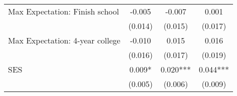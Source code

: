 {\begin{tabular}{lccc}
\hspace{3mm}Max Expectation: Finish school&      -0.005   &      -0.007   &       0.001   \\
                    &     (0.014)   &     (0.015)   &     (0.017)   \\
 
\hspace{3mm}Max Expectation: 4-year college&      -0.010   &       0.015   &       0.016   \\
                    &     (0.016)   &     (0.017)   &     (0.019)   \\
 
\hspace{3mm}SES     &       0.009*  &       0.020***&       0.044***\\
                    &     (0.005)   &     (0.006)   &     (0.009)   \\
 

\bottomrule
\end{tabular}
}
